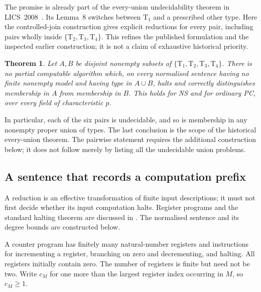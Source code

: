 \documentclass[11pt,a4paper]{article}
\newtheorem{theorem}{Theorem}[section]
\theoremstyle{definition}\newtheorem{definition}[theorem]{Definition}
\theoremstyle{remark}\newtheorem{remark}[theorem]{Remark}
\begin{document}
The promise is already part of the every-union undecidability theorem
in LICS~2008~\cite[Theorem~1]{Riis}. Its Lemma~8 switches between
$\mathrm T_1$ and a prescribed other type. Here the controlled-join
construction gives explicit reductions for every pair, including
pairs wholly inside $\{\mathrm T_2,\mathrm T_3,\mathrm T_4\}$.
This refines the published formulation and the inspected earlier
construction; it is not a claim of exhaustive historical priority.

\begin{theorem}\label{thm:undecidability}
Let $A,B$ be disjoint nonempty subsets of $\{\mathrm T_1,\mathrm T_2,
\mathrm T_3,\mathrm T_4\}$. There is no partial computable algorithm which,
on every normalised sentence having no finite nonempty model and having
type in $A\cup B$, halts and correctly distinguishes membership in $A$
from membership in $B$. This holds for NS and for ordinary PC, over every
field of characteristic $p$.
\end{theorem}

In particular, each of the six pairs is undecidable, and so is membership
in any nonempty proper union of types. The last conclusion is the scope
of the historical every-union theorem. The pairwise statement requires the
additional construction below; it does not follow merely by listing all
the undecidable union problems.

\subsection{A sentence that records a computation prefix}
A reduction is an effective transformation of finite input descriptions;
it must not first decide whether its input computation halts. Register
programs and the standard halting theorem are discussed in \cite{Cutland}.
The normalised sentence and its degree bounds are constructed below.

A counter program has finitely many natural-number registers and instructions
for incrementing a register, branching on zero and decrementing, and halting.
All registers initially contain zero. The number of registers is finite
but need not be two. Write $c_M$ for one more than the largest register index
occurring in $M$, so $c_M\ge1$.
\end{document}
